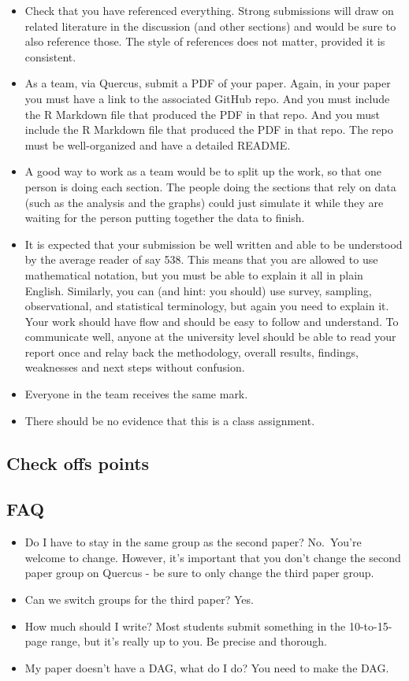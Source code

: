 \documentclass[
]{book}
\providecommand{\tightlist}{%
  \setlength{\itemsep}{0pt}\setlength{\parskip}{0pt}}
\begin{document}
\begin{itemize}
\item
  Check that you have referenced everything. Strong submissions will draw on related literature in the discussion (and other sections) and would be sure to also reference those. The style of references does not matter, provided it is consistent.
\item
  As a team, via Quercus, submit a PDF of your paper. Again, in your paper you must have a link to the associated GitHub repo. And you must include the R Markdown file that produced the PDF in that repo. And you must include the R Markdown file that produced the PDF in that repo. The repo must be well-organized and have a detailed README.
\item
  A good way to work as a team would be to split up the work, so that one person is doing each section. The people doing the sections that rely on data (such as the analysis and the graphs) could just simulate it while they are waiting for the person putting together the data to finish.
\item
  It is expected that your submission be well written and able to be understood by the average reader of say 538. This means that you are allowed to use mathematical notation, but you must be able to explain it all in plain English. Similarly, you can (and hint: you should) use survey, sampling, observational, and statistical terminology, but again you need to explain it. Your work should have flow and should be easy to follow and understand. To communicate well, anyone at the university level should be able to read your report once and relay back the methodology, overall results, findings, weaknesses and next steps without confusion.
\item
  Everyone in the team receives the same mark.
\item
  There should be no evidence that this is a class assignment.
\end{itemize}

\hypertarget{check-offs-points-2}{%
\subsection{Check offs points}\label{check-offs-points-2}}

\hypertarget{faq-2}{%
\subsection{FAQ}\label{faq-2}}

\begin{itemize}
\tightlist
\item
  Do I have to stay in the same group as the second paper? No.~You're welcome to change. However, it's important that you don't change the second paper group on Quercus - be sure to only change the third paper group.
\item
  Can we switch groups for the third paper? Yes.
\item
  How much should I write? Most students submit something in the 10-to-15-page range, but it's really up to you. Be precise and thorough.
\item
  My paper doesn't have a DAG, what do I do? You need to make the DAG.
\end{itemize}
\end{document}
